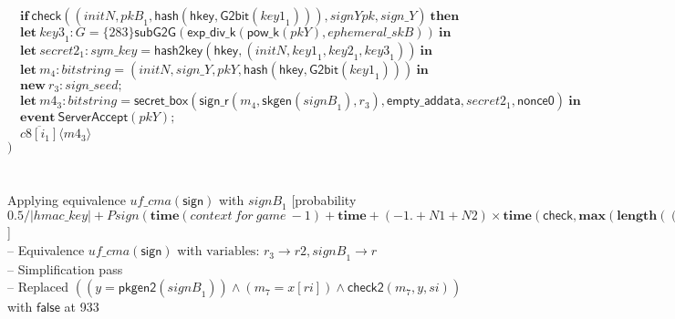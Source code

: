 \documentclass{article}
\newcommand{\coutput}[2]{\overline{#1}\langle{#2}\rangle}
\newcommand{\kw}[1]{\mathbf{#1}}
\newcommand{\kwf}[1]{\mathsf{#1}}
\newcommand{\var}[1]{\mathit{#1}}
\newcommand{\kwt}[1]{\mathit{#1}}
\newcommand{\kwp}[1]{\mathit{#1}}
\newcommand{\kwc}[1]{\mathit{#1}}
\begin{document}
\begin{tabbing}
\>$\quad \kw{if}\ \kwf{check}(\kwf{}(\var{initN}, \var{pkB}_{1}, \kwf{hash}(\kwf{hkey}, \kwf{G2bit}(\var{key1}_{1}))), \var{signYpk}, \var{sign{\_}Y})\ \kw{then}$\\
\>$\quad \kw{let}\ \var{key3}_{1}: \kwt{G} = \{283\}\kwf{subG2G}(\kwf{exp{\_}div{\_}k}(\kwf{pow{\_}k}(\var{pkY}), \var{ephemeral{\_}skB}))\ \kw{in}$\\
\>$\quad \kw{let}\ \var{secret2}_{1}: \kwt{sym{\_}key} = \kwf{hash2key}(\kwf{hkey}, \kwf{}(\var{initN}, \var{key1}_{1}, \var{key2}_{1}, \var{key3}_{1}))\ \kw{in}$\\
\>$\quad \kw{let}\ \var{m}_{4}: \kwt{bitstring} = \kwf{}(\var{initN}, \var{sign{\_}Y}, \var{pkY}, \kwf{hash}(\kwf{hkey}, \kwf{G2bit}(\var{key1}_{1})))\ \kw{in}$\\
\>$\quad \kw{new}\ \var{r}_{3}: \kwt{sign{\_}seed};$\\
\>$\quad \kw{let}\ \var{m4}_{3}: \kwt{bitstring} = \kwf{secret{\_}box}(\kwf{sign{\_}r}(\var{m}_{4}, \kwf{skgen}(\var{signB}_{1}), \var{r}_{3}), \kwf{empty{\_}addata}, \var{secret2}_{1}, \kwf{nonce0})\ \kw{in}$\\
\>$\quad \kw{event}\ \kwf{ServerAccept}(\var{pkY});$\\
\>$\quad \coutput{\kwc{c8}[\var{i}_{1}]}{\var{m4}_{3}}$\\
\>$)$\\
\\
\\
Applying equivalence $\kwc{uf{\_}cma}(\kwf{sign})$ with $\var{signB}_{1}$ {}[probability $0.5 / |\kwt{hmac{\_}key}| + \var{Psign}(\kw{time}(\mathit{context\ for\ game}\ -1) + \kw{time} + (-1. + \kwp{N1} + \kwp{N2}) \times \kw{time}(\kwf{check}, \kw{max}(\kw{length}((\kwt{hmac{\_}key}, \kwt{G}, \kwt{bitstring}), \allowbreak \kw{length}(\kwf{hash}, \allowbreak \kw{length}(\kwf{G2bit}))), \allowbreak \kw{length}((\kwt{hmac{\_}key}, \kwt{bitstring}, \kwt{G}, \kwt{bitstring}), \allowbreak \kw{maxlength}(\var{sign{\_}Inv}), \allowbreak \kw{length}(\kwf{hash}, \allowbreak \kw{length}(\kwf{G2bit})))), \allowbreak \kw{max}(\kw{maxlength}(\var{sign{\_}Y}), \allowbreak \kw{maxlength}(\var{sign{\_}B}))), \allowbreak \kwp{N2}, \allowbreak \kw{maxlength}(\var{m}_{4}))${}]{}\\
\quad -- Equivalence $\kwc{uf{\_}cma}(\kwf{sign})$ with $\textrm{variables: }\var{r}_{3} \rightarrow \var{r2}, \var{signB}_{1} \rightarrow \var{r}$\\
\quad -- Simplification pass\\
\qquad -- Replaced $((\var{y}  =  \kwf{pkgen2}(\var{signB}_{1})) \wedge  (\var{m}_{7}  =  \var{x}[\var{ri}]) \wedge  \kwf{check2}(\var{m}_{7}, \var{y}, \var{si}))$ with $\kwf{false}$ at 933\\

\end{tabbing}
\end{document}
